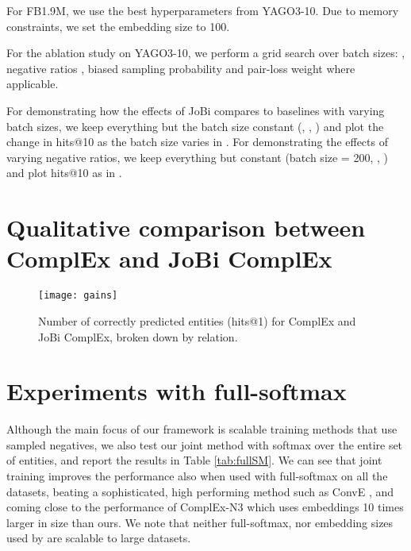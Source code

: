 \documentclass[11pt,a4paper, dvipsnames]{article}
\begin{document}
For FB1.9M, we use the best hyperparameters from YAGO3-10. Due to memory constraints, we set the embedding size to 100. 

For the ablation study on YAGO3-10, we perform a grid search over batch sizes: , negative ratios , biased sampling probability  and pair-loss weight  where applicable. 

For demonstrating how the effects of JoBi compares to baselines with varying batch sizes, we keep everything but the batch size constant (, , ) and plot the change in hits@10 as the batch size varies in . For demonstrating the effects of varying negative ratios, we keep everything but  constant (batch size = 200, , ) and plot hits@10 as  in .

\section{Qualitative comparison between ComplEx and JoBi ComplEx} \label{sec:gains}
\begin{figure}[h]
\texttt{[image: gains]}
\caption{Number of correctly predicted entities (hits@1) for ComplEx and JoBi ComplEx, broken down by relation.} 
\label{fig:gains}
\end{figure}










\section{Experiments with full-softmax}\label{sec:full-softmax}
Although the main focus of our framework is scalable training methods that use sampled negatives, we also test our joint method with softmax over the entire set of entities, and report the results in Table \ref{tab:fullSM}.
We can see that joint training improves the performance also when used with full-softmax on all the datasets,
beating a sophisticated, high performing method such as ConvE \cite{Dettmers2018ConvolutionalEmbeddings}, and coming close to the performance of ComplEx-N3 \citep{Lacroix2018CanonicalCompletion} which uses embeddings 10 times larger in size than ours. We note that neither full-softmax, nor embedding sizes used by \citet{Lacroix2018CanonicalCompletion} are scalable to large datasets. 
\end{document}
